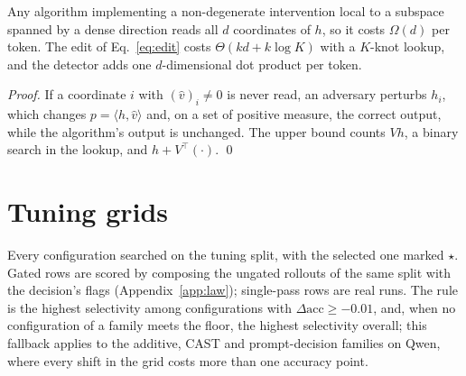 \begin{proposition}
\label{prop:compute}
Any algorithm implementing a non-degenerate intervention local to a subspace
spanned by a dense direction reads all $d$ coordinates of $h$, so it costs
$\Omega(d)$ per token. The edit of Eq.~\eqref{eq:edit} costs $\Theta(kd+k\log K)$ with a
$K$-knot lookup, and the detector adds one $d$-dimensional dot product per
token.
\end{proposition}

\emph{Proof.} If a coordinate $i$ with $(\hat v)_i\neq0$ is never read, an
adversary perturbs $h_i$, which changes $p=\langle h,\hat v\rangle$ and, on a
set of positive measure, the correct output, while the algorithm's output is
unchanged. The upper bound counts $Vh$, a binary search in the lookup, and
$h+V^\top(\cdot)$. \qed

\section{Tuning grids}
\label{app:tuning}

Every configuration searched on the tuning split, with the selected one marked
$\star$. Gated rows are scored by composing the ungated rollouts of the same
split with the decision's flags (Appendix~\ref{app:law}); single-pass rows are
real runs. The rule is the highest selectivity among configurations with
$\Delta\mathrm{acc}\ge-0.01$, and, when no configuration of a family meets the
floor, the highest selectivity overall; this fallback applies to the additive,
CAST and prompt-decision families on Qwen, where every shift in the grid costs
more than one accuracy point.

